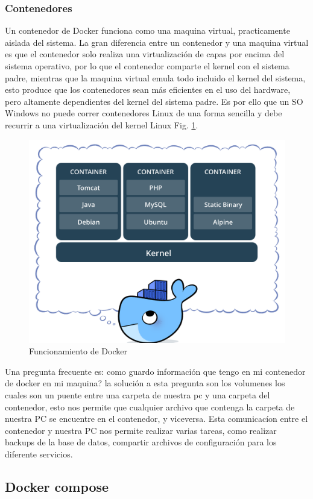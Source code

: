 \subsubsection{Contenedores}


Un contenedor de Docker funciona como una maquina virtual, practicamente aislada del sistema. La gran diferencia entre un contenedor y una maquina virtual es que el contenedor solo realiza una virtualización de capas por encima del sistema operativo, por lo que el contenedor comparte el kernel con el sistema padre, mientras que la maquina virtual emula todo incluido el kernel del sistema, esto produce que los contenedores sean más eficientes en el uso del hardware, pero altamente dependientes del kernel del sistema padre. Es por ello que un SO Windows no puede correr contenedores Linux de una forma sencilla y debe recurrir a una virtualización del kernel Linux Fig. \ref{fig:docker-funcinamiento}.


\begin{figure}[bth]
    \centering
    \includegraphics[width=.5\textwidth]{imgs/contenedores-docker.png}
    \caption{Funcionamiento de Docker}
    \label{fig:docker-funcinamiento}

\end{figure}

Una pregunta frecuente es: como guardo información que tengo en mi contenedor de docker en mi maquina? la solución a esta pregunta son los volumenes los cuales son un puente entre una carpeta de nuestra pc y una carpeta del contenedor, esto nos permite que cualquier archivo que contenga la carpeta de nuestra PC se encuentre en el contenedor, y viceversa. Esta comunicacíon entre el contenedor y nuestra PC nos permite realizar varias tareas, como realizar backups de la base de datos, compartir archivos de configuración para los diferente servicios.

\subsection{Docker compose}

